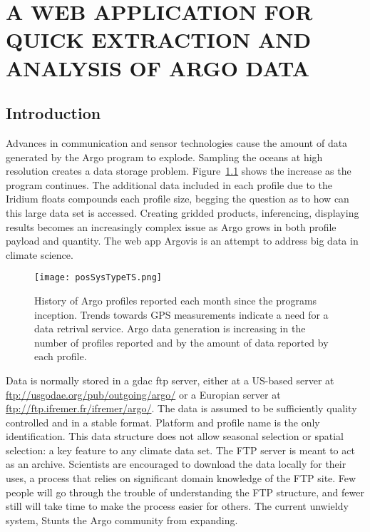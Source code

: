 \chapter{A WEB APPLICATION FOR QUICK EXTRACTION AND ANALYSIS OF ARGO DATA}
\label{chap:argo}

\section{Introduction}

Advances in communication and sensor technologies cause the amount of data generated by the Argo program to explode. Sampling the oceans at high resolution creates a data storage problem. Figure~\ref{fig:prof_vs_time} shows the increase as the program continues. The additional data included in each profile due to the Iridium floats compounds each profile size, begging the question as to how can this large data set is accessed. Creating gridded products, inferencing, displaying results becomes an increasingly complex issue as Argo grows in both profile payload and quantity. The web app Argovis is an attempt to address big data in climate science.

\begin{figure}[ht]
\centering
\begin{minipage}{6in}
\texttt{[image: posSysTypeTS.png]}
\caption{\label{fig:prof_vs_time} History of Argo profiles reported each month since the programs inception. Trends towards GPS measurements indicate a need for a data retrival service. Argo data generation is increasing in the number of profiles reported and by the amount of data reported by each profile.}
\end{minipage}
\end{figure}

Data is normally stored in a \gls{gdac} \gls{ftp} server, either at a US-based server at \url{ftp://usgodae.org/pub/outgoing/argo/} or a Europian server at \url{ftp://ftp.ifremer.fr/ifremer/argo/}. The data is assumed to be sufficiently quality controlled and in a stable format. Platform and profile name is the only identification. This data structure does not allow seasonal selection or spatial selection: a key feature to any climate data set. The FTP server is meant to act as an archive. Scientists are encouraged to download the data locally for their uses, a process that relies on significant domain knowledge of the FTP site. Few people will go through the trouble of understanding the FTP structure, and fewer still will take time to make the process easier for others. The current unwieldy system, Stunts the Argo community from expanding.

